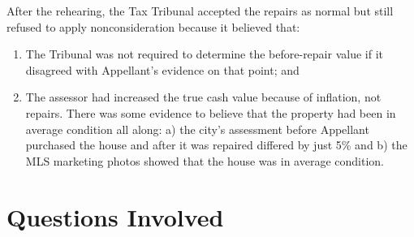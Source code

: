 \documentclass[12pt,\documentclassflag]{michiganCourtOfAppealsBrief}
\begin{document}
After the rehearing, the Tax Tribunal accepted the repairs as normal but still refused to apply nonconsideration because it believed that:

\begin{enumerate}
\item The Tribunal was not required to determine the before-repair value if it disagreed with Appellant's evidence on that point; and
\item The assessor had increased the true cash value because of inflation, not repairs. There was some evidence to believe that the property had been in average condition all along: a) the city's assessment before Appellant purchased the house and after it was repaired differed by just 5\% and b) the MLS marketing photos showed that the house was in average condition. 
\end{enumerate}








\newpage 
\section{Questions Involved}
\end{document}
